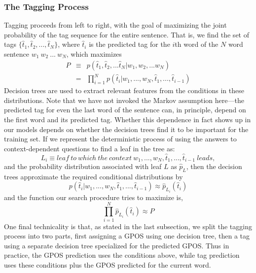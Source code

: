 \subsubsection{The Tagging Process}

Tagging proceeds from left to right, with the goal of maximizing the
joint probability of the tag sequence for the entire sentence. That
is, we find the set of tags $\{\hat{t}_1, \hat{t}_2, ...,
\hat{t}_N\}$, where $\hat{t}_i$ is the predicted tag for the $i$th
word of the $N$ word sentence $w_1\ w_2\ ...\ w_N$, which maximizes
\begin{eqnarray}
P &\equiv& p(\hat{t}_1, \hat{t}_2, ... \hat{t}_N | w_1, w_2, ... w_N) \\
&=&\prod_{i=1}^N p(\hat{t}_i | w_1, ..., w_N, \hat{t}_1, ..., \hat{t}_{i-1})
\end{eqnarray}
Decision trees are used to extract relevant features from the conditions in these distributions.
Note that we have not invoked the Markov assumption here---the predicted tag
for even the last word of the sentence can, in principle, depend on the first word
and its predicted tag.
Whether this dependence in fact shows up in our models depends on 
whether the decision trees find it to be important for the training set.
If we represent the deterministic process of using the answers to context-dependent
questions to find a leaf in the tree as:
\begin{equation}
L_i \equiv leaf\ to\ which\ the\ context\ w_1, ..., w_N, \hat{t}_1, ..., \hat{t}_{i-1}\ leads,
\end{equation}
and the probability distribution associated with leaf $L$ as $\hat{p}_L$,
then the decision trees approximate the required conditional
distributions by
\begin{equation}
p(\hat{t}_i | w_1, ..., w_N, \hat{t}_1, ..., \hat{t}_{i-1}) \approx
\hat{p}_{L_i}(\hat{t}_i)
\end{equation}
and the function our search procedure tries to maximize is,
\begin{equation}
\prod_{i=1}^N \hat{p}_{L_i}(\hat{t}_i) \approx P
\end{equation}
One final technicality is that, as stated in the last subsection, we
split the tagging process into two parts, first assigning a GPOS using
one decision tree, then a tag using a separate decision tree
specialized for the predicted GPOS.  Thus in practice, the GPOS
prediction uses the conditions above, while tag prediction uses these
conditions plus the GPOS predicted for the current word.

